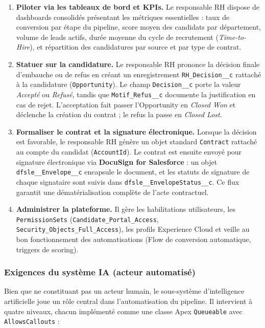 \begin{enumerate}[label=\textbf{EF-H\arabic*}]
    \item \textbf{Piloter via les tableaux de bord et KPIs.} Le responsable RH dispose de dashboards consolidés présentant les métriques essentielles : taux de conversion par étape du pipeline, score moyen des candidats par département, volume de leads actifs, durée moyenne du cycle de recrutement (\textit{Time-to-Hire}), et répartition des candidatures par source et par type de contrat.
    
    \item \textbf{Statuer sur la candidature.} Le responsable RH prononce la décision finale d'embauche ou de refus en créant un enregistrement \texttt{RH\_Decision\_\_c} rattaché à la candidature (\texttt{Opportunity}). Le champ \texttt{Decision\_\_c} porte la valeur \textit{Accepté} ou \textit{Refusé}, tandis que \texttt{Motif\_Refus\_\_c} documente la justification en cas de rejet. L'acceptation fait passer l'Opportunity en \textit{Closed Won} et déclenche la création du contrat ; le refus la passe en \textit{Closed Lost}.
    
    \item \textbf{Formaliser le contrat et la signature électronique.} Lorsque la décision est favorable, le responsable RH génère un objet standard \texttt{Contract} rattaché au compte du candidat (\texttt{AccountId}). Le contrat est ensuite envoyé pour signature électronique via \textbf{DocuSign for Salesforce} : un objet \texttt{dfsle\_\_Envelope\_\_c} encapsule le document, et les statuts de signature de chaque signataire sont suivis dans \texttt{dfsle\_\_EnvelopeStatus\_\_c}. Ce flux garantit une dématérialisation complète de l'acte contractuel.
    
    \item \textbf{Administrer la plateforme.} Il gère les habilitations utilisateurs, les \texttt{PermissionSets} (\texttt{Candidate\_Portal\_Access}, \texttt{Security\_Objects\_Full\_Access}), les profils Experience Cloud et veille au bon fonctionnement des automatisations (Flow de conversion automatique, triggers de scoring).
\end{enumerate}

\subsubsection{Exigences du système IA (acteur automatisé)}

Bien que ne constituant pas un acteur humain, le sous-système d'intelligence artificielle joue un rôle central dans l'automatisation du pipeline. Il intervient à quatre niveaux, chacun implémenté comme une classe Apex \texttt{Queueable} avec \texttt{AllowsCallouts} :


